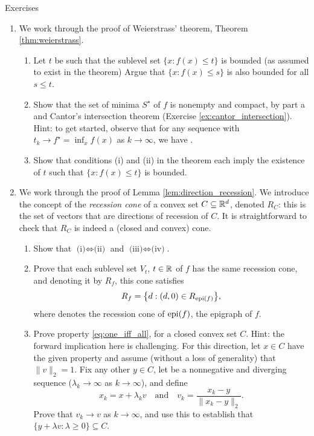 \begin{xcb}{Exercises}
\begin{enumerate}[label=\thechapter.\arabic*]
\item \label{ex:weierstrass} 
  We work through the proof of Weierstrass' theorem, Theorem
  \ref{thm:weierstrass}. 

\begin{enumerate}[label=\alph*.]
\item Let $t$ be such that the sublevel set $\{x : f(x) \leq t\}$ is bounded (as
  assumed to exist in the theorem) Argue that $\{x : f(x) \leq s\}$ is also
  bounded for all $s \leq t$. 

\item Show that the set of minima $S^\star$ of $f$ is nonempty and compact,
  by part a and Cantor's intersection theorem (Exercise
  \ref{ex:cantor_intersection}). Hint: to get started, observe that for any 
  sequence  with $t_k \to f^\star = \inf_x f(x)$
  as $k \to \infty$, we have .   

\item Show that conditions (i) and (ii) in the theorem each imply the existence
  of $t$ such that $\{x : f(x) \leq t\}$ is bounded. 
\end{enumerate}

\item \label{ex:direction_recession}
  We work through the proof of Lemma \ref{lem:direction_recession}. We introduce
  the concept of the \emph{recession cone} of a convex set $C \subseteq \mathbb{R}^d$, 
  denoted $R_C$: this is the set of vectors that are directions of recession of
  $C$. It is straightforward to check that $R_C$ is indeed a (closed and convex) 
  cone. 

\begin{enumerate}[label=\alph*.]
\item Show that $\text{(i)} \iff \text{(ii)}$ and $\text{(iii)} \iff
  \text{(iv)}$. 

\item Prove that each sublevel set $V_t$, $t \in \mathbb{R}$ of $f$ has the same
  recession cone, and denoting it by $R_f$, this cone satisfies 
  \[
  R_f = \big\{ d : (d,0) \in R_{\operatorname{epi}(f)} \big\},
  \]
  where  denotes the recession cone of $\operatorname{epi}(f)$, the
  epigraph of $f$. 

\item Prove property \eqref{eq:one_iff_all}, for a closed convex set $C$. Hint:
  the forward implication here is challenging. For this direction, let $x \in C$
  have the given property and assume (without a loss of generality) that
  $\|v\|_2 =  1$. Fix any other $y \in C$, let
   be a nonnegative and diverging sequence
  ($\lambda_k \to \infty$ as $k \to \infty$), and define 
  \[
  x_k = x + \lambda_k v \quad \text{and} \quad v_k = \frac{x_k - y}{\|x_k -
    y\|_2}. 
  \] 
  Prove that $v_k \to v$ as $k \to \infty$, and use this to establish that $\{y
  + \lambda v : \lambda \geq 0\} \subseteq C$. 


\end{enumerate}
\end{enumerate}
\end{xcb}
